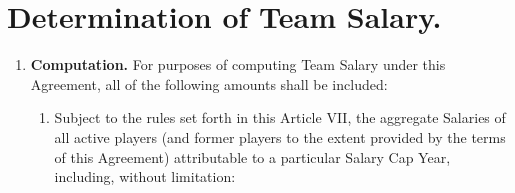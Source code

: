 \documentclass[
]{book}
\providecommand{\tightlist}{%
  \setlength{\itemsep}{0pt}\setlength{\parskip}{0pt}}
\begin{document}
\hypertarget{determination-of-team-salary.}{%
\section{Determination of Team Salary.}\label{determination-of-team-salary.}}

\begin{enumerate}
\def\labelenumi{(\alph{enumi})}
\tightlist
\item
  \textbf{Computation.} For purposes of computing Team Salary under this Agreement, all of the following amounts shall be included:

  \begin{enumerate}
  \def\labelenumii{(\arabic{enumii})}
  \item
    Subject to the rules set forth in this Article VII, the aggregate Salaries of all active players (and former players to the extent provided by the terms of this Agreement) attributable to a particular Salary Cap Year, including, without limitation:


\end{enumerate}
\end{enumerate}
\end{document}
